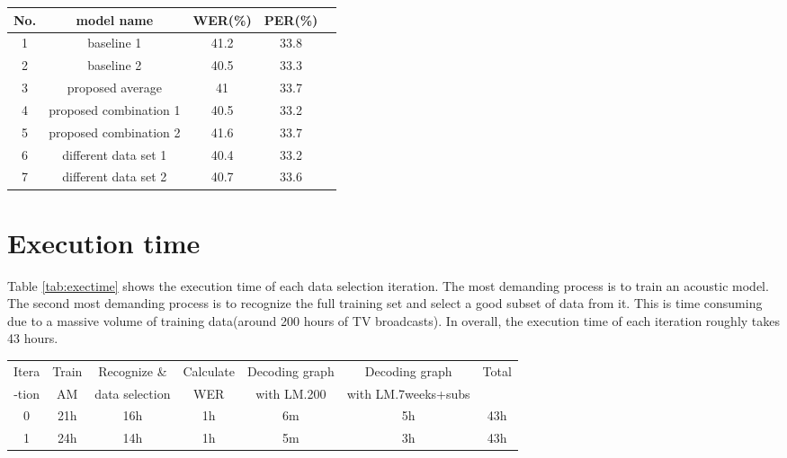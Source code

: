 

\begin{center}
\label{tab:proposedModel}
\begin{tabular}{ | c | c | c | c | c |   }
\hline
No.  & model name & WER(\%) & PER(\%) \\ \hline
1  & baseline 1 & 41.2 & 33.8  \\ \hline
2  & baseline 2 & 40.5 & 33.3  \\ \hline
3 & proposed average & 41 & 33.7 \\ \hline
4 & proposed combination 1 & 40.5 & 33.2 \\ \hline
5 & proposed combination 2 &  41.6 & 33.7  \\ \hline
6 & different data set 1 & 40.4 & 33.2 \\ \hline
7 & different data set 2 & 40.7 & 33.6 \\ \hline
\end{tabular}
\end{center}

\section{Execution time}

Table \ref{tab:exectime} shows the execution time of each data selection iteration. The most demanding process is to train an acoustic model. The second most demanding process is to recognize the full training set and select  a good subset of data from it. This is time consuming due to a massive volume of training data(around 200 hours of TV broadcasts). In overall, the execution time of each iteration roughly takes 43 hours. 

\begin{center}
\label{tab:exectime}
\begin{tabular}{ | c | c | c | c | c | c | c |   }
\hline
Itera & Train & Recognize \&  & Calculate & Decoding graph  & Decoding graph  & Total \\ 
-tion & AM &  data selection & WER & with LM.200 &  with LM.7weeks+subs & \\ \hline
0 & 21h & 16h & 1h & 6m & 5h & 43h  \\ \hline
1 & 24h & 14h & 1h & 5m & 3h & 43h  \\ \hline
\end{tabular}
\end{center}

